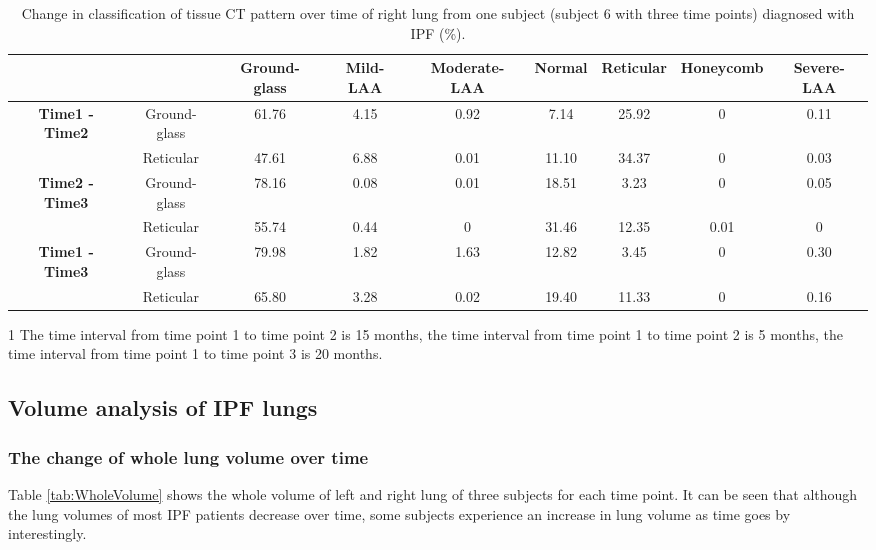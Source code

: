 \begin{landscape}
\begin{table}[p]
\centering
\caption{Change in classification of tissue CT pattern over time of right lung from one subject (subject 6 with three time points) diagnosed with IPF (\%).}
\label{tab:ChangeOverTimeRight}
\begin{tabular}{c c c c c c c c c}
\hline
\quad & \quad & \bf{Ground-glass} &	\bf{Mild-LAA} &	\bf{Moderate-LAA} &	\bf{Normal} &	\bf{Reticular} &	\bf{Honeycomb} &	\bf{Severe-LAA}\\
\hline
\bf{Time1 - Time2} &	Ground-glass &	61.76 &	4.15 &	0.92 &	7.14 &	25.92 &	0 &	0.11\\
\quad & Reticular	& 47.61 &	6.88 &	0.01 &	11.10 &	34.37 &	0 &	0.03\\
\hline
\bf{Time2 - Time3} &	Ground-glass &	78.16 &	0.08 &	0.01 &	18.51 &	3.23 &	0 &	0.05\\
\quad & Reticular &	55.74 &	0.44 &	0 &	31.46 &	12.35 &	0.01 &	0\\
\hline
\bf{Time1 - Time3} &	Ground-glass &	79.98 &	1.82 &	1.63 &	12.82 &	3.45 &	0 &	0.30\\
\quad & Reticular &	65.80 &	3.28 &	0.02 &	19.40 &	11.33 &	0 &	0.16\\
\hline
\end{tabular}
\begin{tablenotes}
  \item[1] The time interval from time point 1 to time point 2 is 15 months, the time interval from time point 1 to time point 2 is 5 months, the time interval from time point 1 to time point 3 is 20 months.
\end{tablenotes}
\end{table}
\end{landscape}
\restoregeometry %

\subsection{Volume analysis of IPF lungs} \label{VolumeAnalysis}
\subsubsection{The change of whole lung volume over time}
Table \ref{tab:WholeVolume} shows the whole volume of left and right lung of three subjects for each time point. It can be seen that although the lung volumes of most IPF patients decrease over time, some subjects experience an increase in lung volume as time goes by interestingly.

